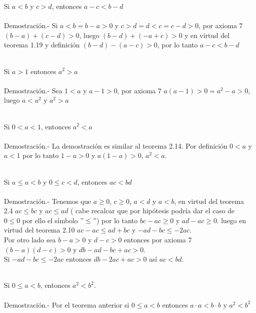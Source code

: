 \begin{teo}
Si $a<b$ y $c>d$, entonces $a-c<b-d$\\\\
Demostración.- \;
Si $a<b = b-a>0$ \; y  \; $c>d=d<c=c-d>0$, por axioma 7 \; $(b-a)+(c-d)>0$, luego $(b-d)+(-a+c)>0$ y en virtud del teorema 1.19 y definición \; $(b-d)-(a-c)>0$, por lo tanto $a-c<b-d$\\\\
\end{teo}

\begin{teo}
Si $a>1$ entonces $a^2>a$\\\\
Demostración.- \;
Sea $1<a$ y $a-1>0$, por axioma 7 $a(a-1)>0=a^2-a>0$, luego $a<a^2$ y $a^2>a$\\\\
\end{teo}

\begin{teo}
Si $0<a<1$, entonces $a^2<a$\\\\
Demostración.- \;
La demostración es similar al teorema 2.14. Por definición $0<a$ y $a<1$ por lo tanto $1-a>0$ y $a(1-a)>0$,\; $a^2<a$.\\\\
\end{teo}

\begin{teo}
Si $a\leq a < b$ \; y \; $0 \leq c < d$, entonces $ac<bd$\\\\
Demostración.- \;
Tenemos que $a\geq 0$, $c\geq 0$, $a<d$ y $a<b$, en virtud del  teorema 2.4 $ac\leq bc$ y $ac \leq ad$ ( cabe recalcar que por hipótesis podría dar el caso de $0 \leq 0$  por ello el símbolo $" \leq "$) por lo tanto $bc-ac \geq 0$ \; y \; $ad-ac \geq 0$. luego en virtud del teorema 2.10\; $ac-ac \leq ad+bc$ y $-ad-bc\leq -2ac$. \\ 
Por otro lado sea $b-a>0$ \; y \; $d-c>0$ entonces por axioma 7 \; $(b-a)(d-c)>0$ \; y \; $db-ad-bc+ac>0$.\\
Si $-ad-bc\leq -2ac$ entonces $db -2ac +ac>0$ \; así \; $ac < bd$.\\\\
\end{teo}
   
\begin{teo}
Si $0\leq a < b$, entonces $a^2<b^2.$\\\\
Demostración.- \;
Por el teorema anterior si $0\leq a < b$ entonces $a\cdot a < b\cdot b$\; y \; $a^2<b^2$\\\\
\end{teo}

